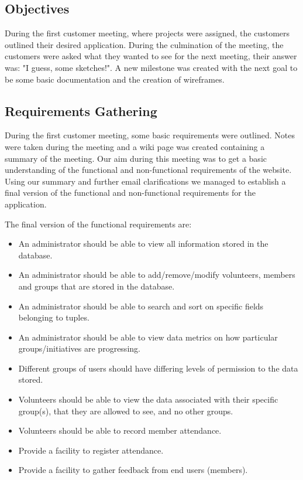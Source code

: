 \documentclass{l3proj}
\begin{document}
\subsection{Objectives}
\label{objectives}

During the first customer meeting, where projects were assigned, the customers outlined their desired application. During the culmination of the meeting, the customers were asked what they wanted to see for the next meeting, their answer was: "I guess, some sketches!". A new milestone was created with the next goal to be some basic documentation and the creation of wireframes.

\subsection{Requirements Gathering}
\label{requirements}

During the first customer meeting, some basic requirements were outlined. Notes were taken during the meeting and a wiki page was created containing a summary of the meeting. Our aim during this meeting was to get a basic understanding of the functional and non-functional requirements of the website. Using our summary and further email clarifications we managed to establish a final version of the functional and non-functional requirements for the application.

The final version of the functional requirements are:
\begin{itemize}

\item An administrator should be able to view all information stored in the database.

\item An administrator should be able to add/remove/modify volunteers, members and groups that are stored in the database.

\item An administrator should be able to search and sort on specific fields belonging to tuples.

\item An administrator should be able to view data metrics on how particular groups/initiatives are progressing.

\item Different groups of users should have differing levels of permission to the data stored.

\item Volunteers should be able to view the data associated with their specific group(s), that they are allowed to see, and no other groups.

\item Volunteers should be able to record member attendance.

\item Provide a facility to register attendance.

\item Provide a facility to gather feedback from end users (members).

\end{itemize}
\end{document}
